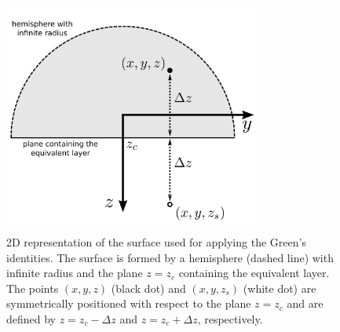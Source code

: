 
\begin{figure}
	\centering
	\includegraphics[width=0.75\textwidth]{Fig/figure7}
	\caption{2D representation of the surface used for applying the Green's 
	identities. The surface is formed by a hemisphere (dashed line) with infinite
	radius and the plane $z = z_{c}$ containing the equivalent layer. 
	The points $(x, y, z)$ (black dot) and $(x, y, z_{s})$ (white dot) are 
	symmetrically positioned with respect to the plane $z = z_{c}$ and are
	defined by $z = z_{c} - \Delta z$ and $z = z_{c} + \Delta z$, respectively.}
	\label{fig:surface_Green}
\end{figure}